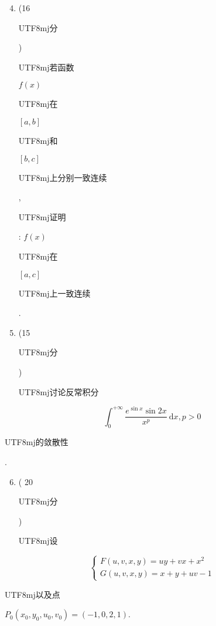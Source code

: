 \documentclass[10pt]{article}
\begin{document}
\begin{enumerate}
  \setcounter{enumi}{3}
  \item (16 \begin{CJK}{UTF8}{mj}分\end{CJK}) \begin{CJK}{UTF8}{mj}若函数\end{CJK} $f(x)$ \begin{CJK}{UTF8}{mj}在\end{CJK} $[a, b]$ \begin{CJK}{UTF8}{mj}和\end{CJK} $[b, c]$ \begin{CJK}{UTF8}{mj}上分别一致连续\end{CJK}, \begin{CJK}{UTF8}{mj}证明\end{CJK}: $f(x)$ \begin{CJK}{UTF8}{mj}在\end{CJK} $[a, c]$ \begin{CJK}{UTF8}{mj}上一致连续\end{CJK}.

  \item (15 \begin{CJK}{UTF8}{mj}分\end{CJK}) \begin{CJK}{UTF8}{mj}讨论反常积分\end{CJK}

\end{enumerate}
$$
\int_{0}^{+\infty} \frac{e^{\sin x} \sin 2 x}{x^{p}} \mathrm{~d} x, p>0
$$
\begin{CJK}{UTF8}{mj}的敛散性\end{CJK}.

\begin{enumerate}
  \setcounter{enumi}{5}
  \item ( 20 \begin{CJK}{UTF8}{mj}分\end{CJK}) \begin{CJK}{UTF8}{mj}设\end{CJK}
\end{enumerate}
$$
\left\{\begin{array}{l}
F(u, v, x, y)=u y+v x+x^{2} \\
G(u, v, x, y)=x+y+u v-1
\end{array}\right.
$$
\begin{CJK}{UTF8}{mj}以及点\end{CJK} $P_{0}\left(x_{0}, y_{0}, u_{0}, v_{0}\right)=(-1,0,2,1)$.
\end{document}
